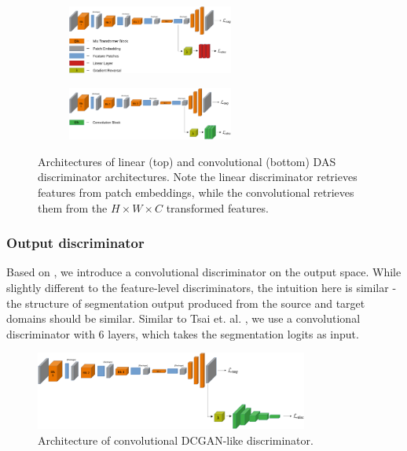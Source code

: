 \documentclass[a4paper,12pt]{report}
\begin{document}
\bigbreak
\begin{figure}[h]
    \centering
    \begin{subfigure}[b]{\textwidth}
        \centering
        \includegraphics[width=0.6\textwidth]{res/discriminator-diagrams/linear.pdf}
        \label{fig:das-discriminators-linear}
    \end{subfigure}
    \begin{subfigure}[b]{\textwidth}
        \centering
        \includegraphics[width=0.6\textwidth]{res/discriminator-diagrams/convolutional.pdf}
        \label{fig:das-discriminators-conv}
    \end{subfigure}
    \caption{Architectures of linear (top) and convolutional (bottom) DAS discriminator architectures. Note the linear discriminator retrieves features from patch embeddings, while the convolutional retrieves them from the $H \times W \times C$ transformed features.}
    \label{fig:das-discriminators}
\end{figure}

\subsubsection{Output discriminator}

Based on \cite{tsai_learning_2020}, we introduce a convolutional discriminator on the output space. While slightly different to the feature-level discriminators, the intuition here is similar - the structure of segmentation output produced from the source and target domains should be similar. Similar to Tsai et. al. \cite{tsai_learning_2020}, we use a convolutional discriminator with 6 layers, which takes the segmentation logits as input.

\bigbreak
\begin{figure}[h]
    \centering
    \includegraphics[width=0.8\textwidth]{res/discriminator-diagrams/dcgan-output.pdf}
    \caption{Architecture of convolutional DCGAN-like discriminator.}
    \label{fig:das-discriminators-output}
\end{figure}
\end{document}
